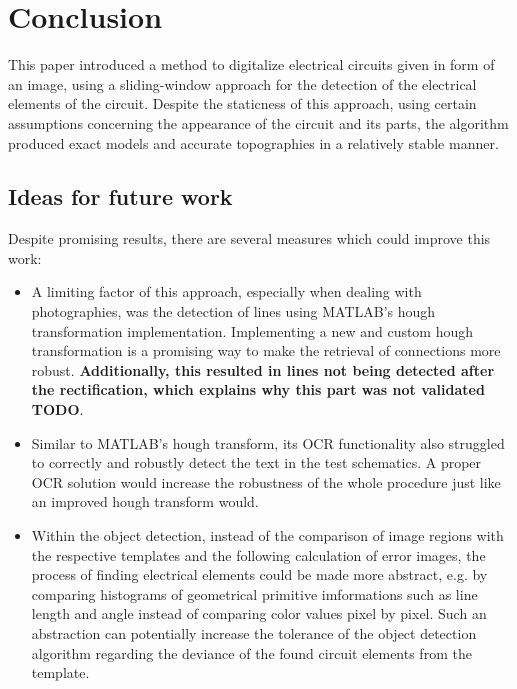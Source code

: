 \documentclass[10pt,twocolumn,letterpaper]{article}
\begin{document}

\section{Conclusion}

This paper introduced a method to digitalize electrical circuits given in form of an image, using a sliding-window approach for the detection of the electrical elements of the circuit. Despite the staticness of this approach, using certain assumptions concerning the appearance of the circuit and its parts, the algorithm produced exact models and accurate topographies in a relatively stable manner.

\subsection*{Ideas for future work}

Despite promising results, there are several measures which could improve this work:
\begin{itemize}
	\item A limiting factor of this approach, especially when dealing with photographies, was the detection of lines using MATLAB's hough transformation implementation. Implementing a new and custom hough transformation is a promising way to make the retrieval of connections more robust. \textbf{Additionally, this resulted in lines not being detected after the rectification, which explains why this part was not validated TODO}.
	\item Similar to MATLAB's hough transform, its OCR functionality also struggled to correctly and robustly detect the text in the test schematics. A proper OCR solution would increase the robustness of the whole procedure just like an improved hough transform would.
	\item Within the object detection, instead of the comparison of image regions with the respective templates and the following calculation of error images, the process of finding electrical elements could be made more abstract, e.g. by comparing histograms of geometrical primitive imformations such as line length and angle instead of comparing color values pixel by pixel. Such an abstraction can potentially increase the tolerance of the object detection algorithm regarding the deviance of the found circuit elements from the template.
\end{itemize}

\end{document}
